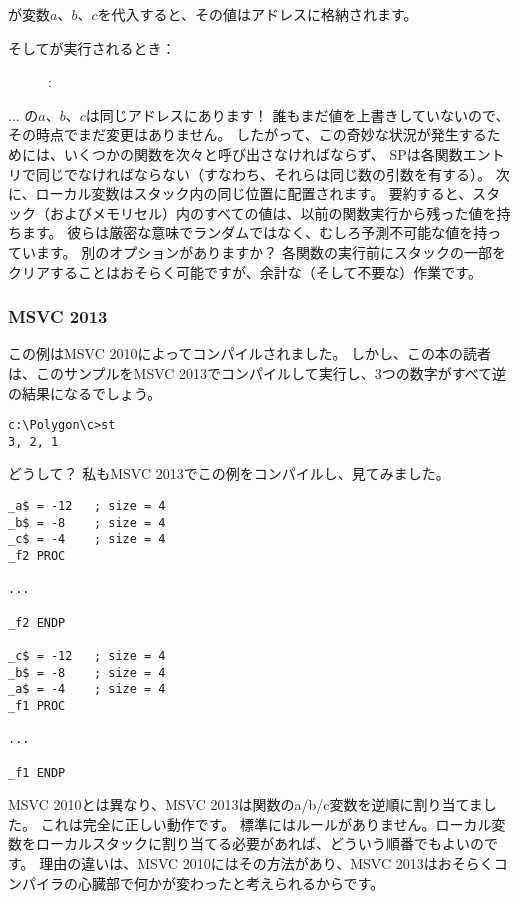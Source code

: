 が変数$a$、$b$、$c$を代入すると、その値はアドレスに格納されます。

\clearpage
そしてが実行されるとき：

\begin{figure}[H]
\centering
{}
\caption{\olly: }
\label{fig:stack_noise_olly2}
\end{figure}

... の$a$、$b$、$c$は同じアドレスにあります！
誰もまだ値を上書きしていないので、その時点でまだ変更はありません。
したがって、この奇妙な状況が発生するためには、いくつかの関数を次々と呼び出さなければならず、
\ac{SP}は各関数エントリで同じでなければならない（すなわち、それらは同じ数の引数を有する）。 
次に、ローカル変数はスタック内の同じ位置に配置されます。 
要約すると、スタック（およびメモリセル）内のすべての値は、以前の関数実行から残った値を持ちます。 
彼らは厳密な意味でランダムではなく、むしろ予測不可能な値を持っています。 
別のオプションがありますか？ 
各関数の実行前にスタックの一部をクリアすることはおそらく可能ですが、余計な（そして不要な）作業です。

\subsubsection{MSVC 2013}

この例はMSVC 2010によってコンパイルされました。
しかし、この本の読者は、このサンプルをMSVC 2013でコンパイルして実行し、3つの数字がすべて逆の結果になるでしょう。

\begin{lstlisting}
c:\Polygon\c>st
3, 2, 1
\end{lstlisting}

どうして？
私もMSVC 2013でこの例をコンパイルし、見てみました。

\begin{lstlisting}[caption=MSVC 2013,style=customasmx86]
_a$ = -12	; size = 4
_b$ = -8	; size = 4
_c$ = -4	; size = 4
_f2	PROC

...

_f2	ENDP

_c$ = -12	; size = 4
_b$ = -8	; size = 4
_a$ = -4	; size = 4
_f1	PROC

...

_f1	ENDP
\end{lstlisting}

MSVC 2010とは異なり、MSVC 2013は関数のa/b/c変数を逆順に割り当てました。
これは完全に正しい動作です。 \CCpp 標準にはルールがありません。ローカル変数をローカルスタックに割り当てる必要があれば、どういう順番でもよいのです。 
理由の違いは、MSVC 2010にはその方法があり、MSVC 2013はおそらくコンパイラの心臓部で何かが変わったと考えられるからです。
